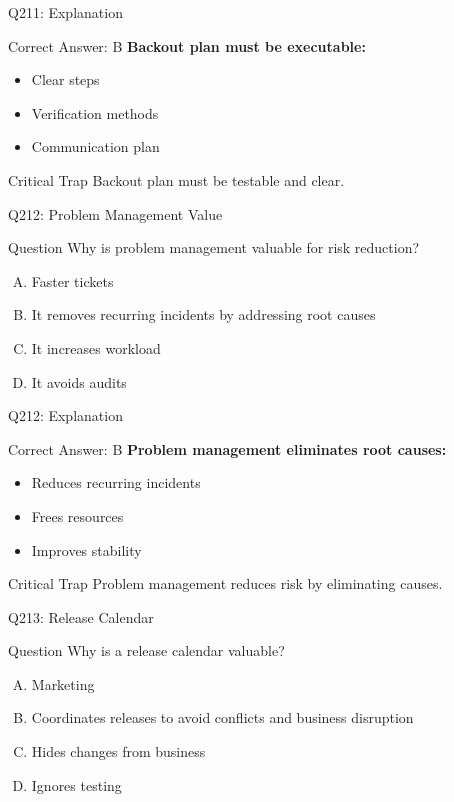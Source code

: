 \documentclass{beamer}
\begin{document}
	\begin{frame}{Q211: Explanation}
		\begin{block}{Correct Answer: B}
			\textbf{Backout plan must be executable:}
			\begin{itemize}
				\item Clear steps
				\item Verification methods
				\item Communication plan
			\end{itemize}
		\end{block}
		\begin{alertblock}{Critical Trap}
			Backout plan must be testable and clear.
		\end{alertblock}
	\end{frame}
	
	\begin{frame}{Q212: Problem Management Value}
		\begin{block}{Question}
			Why is problem management valuable for risk reduction?
		\end{block}
		\begin{enumerate}[(A)]
			\item Faster tickets
			\item It removes recurring incidents by addressing root causes
			\item It increases workload
			\item It avoids audits
		\end{enumerate}
	\end{frame}
	
	\begin{frame}{Q212: Explanation}
		\begin{block}{Correct Answer: B}
			\textbf{Problem management eliminates root causes:}
			\begin{itemize}
				\item Reduces recurring incidents
				\item Frees resources
				\item Improves stability
			\end{itemize}
		\end{block}
		\begin{alertblock}{Critical Trap}
			Problem management reduces risk by eliminating causes.
		\end{alertblock}
	\end{frame}
	
	\begin{frame}{Q213: Release Calendar}
		\begin{block}{Question}
			Why is a release calendar valuable?
		\end{block}
		\begin{enumerate}[(A)]
			\item Marketing
			\item Coordinates releases to avoid conflicts and business disruption
			\item Hides changes from business
			\item Ignores testing
		\end{enumerate}
	\end{frame}
	
\end{document}
